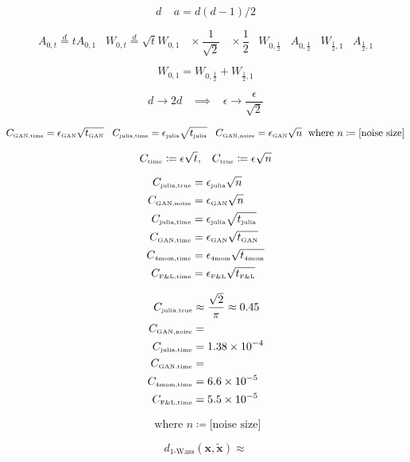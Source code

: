\documentclass[a4paper,11pt]{article}
\renewcommand{\tilde}{\widetilde}
\begin{document}
\[
d \;\;\;\; a = d(d-1)/2
\]

\[
A_{0,t} \overset{d}{=} t A_{0,1} \;\;\; W_{0,t} \overset{d}{=} \sqrt{t} W_{0,1} \;\;\; \times \frac{1}{\sqrt{2}} \;\;\; \times \frac{1}{2} \;\;\; W_{0,\frac{1}{2}} \;\;\; A_{0,\frac{1}{2}} \;\;\; W_{\frac{1}{2}, 1} \;\;\; A_{\frac{1}{2}, 1}
\]

\[
W_{0,1} = W_{0,\frac{1}{2}} + W_{\frac{1}{2}, 1}
\]

\[
d \rightarrow 2d \;\;\; \implies \;\;\; \epsilon \rightarrow \frac{\epsilon}{\sqrt{2}}
\]

\[
C_{\text{\tiny GAN,time}} = \epsilon_{\text{\tiny GAN}} \sqrt{t_{\text{\tiny GAN}}}  \;\;\; C_{\text{\tiny julia,time}} = \epsilon_{\text{\tiny julia}} \sqrt{t_{\text{\tiny julia}}}  \;\;\; C_{\text{\tiny GAN,noise}} = \epsilon_{\text{\tiny GAN}} \sqrt{n} \;\text{ where } n \coloneqq \text{[noise size]}
\]

\[
C_{\text{\tiny time}} \coloneqq \epsilon \sqrt{t}, \;\;\; C_{\text{\tiny true}} \coloneqq \epsilon \sqrt{n}
\]

\begin{align}
    C_{\text{\tiny julia,true}} &= \epsilon_{\text{\tiny julia}} \sqrt{n} \\
    C_{\text{\tiny GAN,noise}} &= \epsilon_{\text{\tiny GAN}} \sqrt{n} \\
	C_{\text{\tiny julia,time}} &= \epsilon_{\text{\tiny julia}} \sqrt{t_{\text{\tiny julia}}} \\
    C_{\text{\tiny GAN,time}} &= \epsilon_{\text{\tiny GAN}} \sqrt{t_{\text{\tiny GAN}}} \\
    C_{\text{\tiny 4mom,time}} &= \epsilon_{\text{\tiny 4mom}} \sqrt{t_{\text{\tiny 4mom}}} \\
    C_{\text{\tiny F\&L,time}} &= \epsilon_{\text{\tiny F\&L}} \sqrt{t_{\text{\tiny F\&L}}} \\
\end{align}

\begin{align}
	C_{\text{\tiny julia,true}} &\approx \frac{\sqrt{2}}{\pi} \approx 0.45 \\
    C_{\text{\tiny GAN,noise}} &=  \\
	C_{\text{\tiny julia,time}} &= 1.38 \times 10^{-4} \\
    C_{\text{\tiny GAN,time}} &=  \\
    C_{\text{\tiny 4mom,time}} &= 6.6 \times 10^{-5} \\
    C_{\text{\tiny F\&L,time}} &=  5.5 \times 10^{-5}
\end{align}

\[
\text{ where } n \coloneqq \text{[noise size]}
\]

\[
d_{\text{1-Wass}}({\boldsymbol x}, \tilde{{\boldsymbol x}}) \approx
\]
\end{document}
